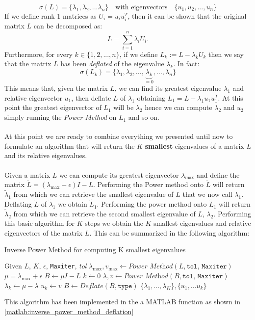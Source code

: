   \[
    \sigma(L) = \{\lambda_1, \lambda_2, ... \lambda_n\} \quad \text{with eigenvectors}  \quad \{u_1, u_2, ... , u_n\}
    \]
If we define rank 1 matrices as \(U_i = u_i u_i^T\), then it can be shown that the original matrix \(L\) can be decomposed as:
\[
L =  \sum \limits_{i=1}^{n} \lambda_i U_i. 
\] 
Furthermore, for every \(k \in \{1, 2, ... , n\}\), if we define \(L_k:= L - \lambda_k U_k\) then we say that the matrix \(L\) has been \textit{deflated} of the eigenvalue \(\lambda_k\). In fact:
\[
    \sigma(L_k) = \{\lambda_1, \lambda_2, ..., \underbrace{\lambda_k}_{=0}, ...,  \lambda_n\} 
\]
This means that, given the matrix \(L\), we can find its greatest eigenvalue \(\lambda_1\) and relative eigenvector \(u_1\), then deflate \(L\) of \(\lambda_1\) obtaining \(L_1 = L - \lambda_1 u_1 u_1^T\). At this point the greatest eigenvector of \(L_1\) will be \(\lambda_2\) hence we can compute \(\lambda_2\) and \(u_2\) simply running the \textit{Power Method} on \(L_1\) and so on.
\\
\\
At this point we are ready to combine everything we presented until now to formulate an algorithm that will return the \(K\) \textbf{smallest} eigenvalues of a matrix \(L\) and its relative eigenvalues. 
\\
\\
Given a matrix \(L\) we can compute its greatest eigenvector \(\lambda_{\text{max}}\) and define the matrix \(\tilde{L} = (\lambda_{\text{max}} + \epsilon) I - L\). Performing the Power method onto \(\tilde{L}\) will return \(\tilde{\lambda}_1\) from which we can retrieve the smallest eigenvalue of \(L\) that we now call \(\lambda_1\). Deflating \(\tilde{L}\) of \(\tilde{\lambda}_1\) we obtain \(\tilde{L}_1\). Performing the power method onto \(\tilde{L}_1\) will return \(\tilde{\lambda}_2\) from which we can retrieve the second smallest eigenvalue of \(L\), \(\lambda_2\). Performing this basic algorithm for \(K\) steps we obtain the \(K\) smallest eigenvalues and relative eigenvectors of the matrix \(L\). This can be summarized in the following algorithm:

\begin{algorithm}[H]\caption{Inverse Power Method for computing K smallest eigenvalues}
    \label{algo:inverse_power_method_deflation}
    \begin{algorithmic}
     \State Given \(L\), \(K\), \(\epsilon\), \texttt{Maxiter}, \textit{tol} 
     \State \(\lambda_{\text{max}} , v_{\text{max}} \gets \textit{Power Method}(L, \texttt{tol, Maxiter})\)
     \State \(\mu = \lambda_{\text{max}}+ \epsilon\)
     \State \(B \gets \mu I - L\)
     \State \(k \gets 0\)
     \State \(\lambda , v \gets \textit{Power Method}(B, \texttt{tol, Maxiter})\)
     \State \(\lambda_k \gets \mu - \lambda\)
     \State \(u_k \gets v\)
     \State \(B \gets \textit{Deflate}(B, \texttt{type})\)
     \EndFor
     \State
     \Return \(\{\lambda_1, ..., \lambda_K\} , \{u_1, ... u_k\}\)
    \end{algorithmic}            
  \end{algorithm}

  This algorithm has been implemented in the a MATLAB function as shown in \ref{matlab:inverse_power_method_deflation}

